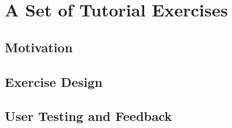 \chapter{A Set of Tutorial Exercises}
\label{ch:tutorial_exercises}

\section{Motivation}
\label{sec:exercises_motivation}


\section{Exercise Design}
\label{sec:exercise_design}



\section{User Testing and Feedback}
\label{sec:exercises_testing}